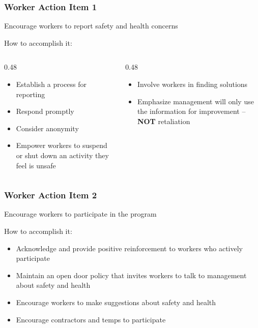 \begin{frame}
    \frametitle{Worker Action Item 1}
    
    Encourage workers to report safety and health concerns

    \begin{block}{How to accomplish it:}
        \vspace{-1.5em}
        \begin{columns}[t]
            \begin{column}{0.48\linewidth}
                \begin{itemize}
                    \item Establish a process for reporting
                    \item Respond promptly
                    \item Consider anonymity
                    \item Empower workers to suspend or shut down an activity they feel is unsafe
                \end{itemize}
            \end{column}
            \begin{column}{0.48\linewidth}
                \begin{itemize}
                    \item Involve workers in finding solutions
                    \item Emphasize management will only use the information for improvement -- \textbf{NOT} retaliation
                \end{itemize}
            \end{column}
        \end{columns}    
    \end{block}
\end{frame}

\begin{frame}
    \frametitle{Worker Action Item 2}

    Encourage workers to participate in the program

    \begin{block}{How to accomplish it:}
        \begin{itemize}[<+- | alert@+>]
            \item Acknowledge and provide positive reinforcement to workers who actively participate
            \item Maintain an open door policy that invites workers to talk to management about safety and health
            \item Encourage workers to make suggestions about safety and health
            \item Encourage contractors and temps to participate
        \end{itemize}
    \end{block}
\end{frame}

